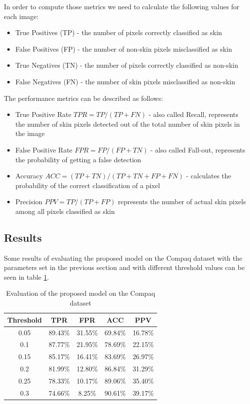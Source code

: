 \documentclass[12pt]{report}
\begin{document}
	In order to compute those metrics we need to calculate the following values for each image:
	\begin{itemize}
		\item True Positives (TP) - the number of pixels correctly classified as skin
		\item False Positives (FP) - the number of non-skin pixels misclassified as skin
		\item True Negatives (TN) - the number of pixels correctly classified as non-skin
		\item False Negatives (FN) - the number of skin pixels misclassified as non-skin
	\end{itemize}

	The performance metrics can be described as follows:
	\begin{itemize}
		\item True Positive Rate $TPR = TP / (TP + FN)$ - also called Recall, represents the number of skin pixels detected out of the total number of skin pixels in the image
		\item False Positive Rate $FPR = FP / (FP + TN)$ - also called Fall-out, represents the probability of getting a false detection
		\item Accuracy $ ACC = (TP + TN) / (TP + TN + FP + FN) $ - calculates the probability of the correct classification of a pixel 
		\item Precision $ PPV = TP / (TP + FP) $ represents the number of actual skin pixels among all pixels classified as skin
	\end{itemize}

	\subsection{Results}
	Some results of evaluating the proposed model on the Compaq dataset with the parameters set in the previous section and with different threshold values can be seen in table \ref{tab:results}.
	
	\begin{table}[h!]
		\begin{center}
			\caption{Evaluation of the proposed model on the Compaq dataset}
			\label{tab:results}
			\begin{tabular}{c|c|c|c|c}
				\textbf{Threshold} & \textbf{TPR} & \textbf{FPR} & \textbf{ACC} & \textbf{PPV} \\
				\hline
				0.05 & 89.43\% & 31.55\% & 69.84\% & 16.78\% \\
				0.1 & 87.77\% & 21.95\% & 78.69\% & 22.15\% \\
				0.15 & 85.17\% & 16.41\% & 83.69\% & 26.97\% \\
				0.2 & 81.99\% & 12.80\% & 86.84\% & 31.29\% \\
				0.25 & 78.33\% & 10.17\% & 89.06\% & 35.40\% \\
				0.3 & 74.66\% & 8.25\% & 90.61\% & 39.17\% \\
		
			\end{tabular}
		\end{center}
	\end{table}
	
\end{document}
